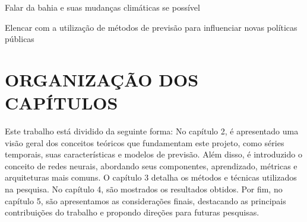     Falar da bahia e suas mudanças climáticas se possível
    
    Elencar com a utilização de métodos de previsão para influenciar novas políticas públicas
    

\section{ORGANIZAÇÃO DOS CAPÍTULOS}
    Este trabalho está dividido da seguinte forma: No capítulo 2, é apresentado uma visão geral dos conceitos teóricos que 
    fundamentam este projeto, como séries temporais, suas características e modelos de previsão. Além disso, é introduzido o 
    conceito de redes neurais, abordando seus componentes, aprendizado, métricas e arquiteturas mais comuns. O capítulo 3 
    detalha os métodos e técnicas utilizados na pesquisa. No capítulo 4, são mostrados os resultados obtidos. Por fim, no 
    capítulo 5, são apresentamos as considerações finais, destacando as principais contribuições do trabalho e propondo direções 
    para futuras pesquisas.